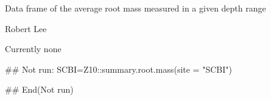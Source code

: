 \documentclass[a4paper]{book}
\begin{document}
%
\begin{Value}
Data frame of the average root mass measured in a given depth range
\end{Value}
%
\begin{Author}\relax
Robert Lee \\{}
\end{Author}
%
\begin{SeeAlso}\relax
Currently none
\end{SeeAlso}
%
\begin{Examples}
\begin{ExampleCode}
## Not run: 
SCBI=Z10::summary.root.mass(site = "SCBI")

## End(Not run)
\end{ExampleCode}
\end{Examples}
\printindex{}
\end{document}
